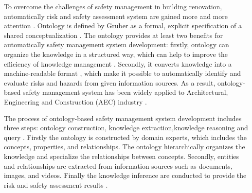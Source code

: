 To overcome the challenges of safety management in building renovation, automatically risk and safety assessment system are gained more and more attention \cite[]{xing2019ontology,doukari2023bim,amorocho2021reno,qi2023bim,zhou2023bim}. 
Ontology is defined by Gruber as a formal, explicit specification of a shared conceptualization \cite[]{gruber1995toward}. 
The ontology provides at least two benefits for automatically safety management system development: firstly, ontology can organize the knowledge in a structured way, which can help to improve the efficiency of knowledge management \cite[]{zhang2015ontology}. 
Secondly, it converts knowledge into a machine-readable format \cite[]{donini1996reasoning}, which make it possible to automatically identify and evaluate risks and hazards from given information sources.
As a result, ontology-based safety management system has been widely applied to Architectural, Engineering and Construction (AEC) industry \cite[]{zhong2015ontological,zhang2015ontology,wang2011ontology,guo2017ontology,xing2019ontology,gao2022knowledge}.

The process of ontology-based safety management system development includes three steps: ontology construction, knowledge extraction,knowledge reasoning and query \cite[]{doukari2024ontology,fang2020knowledge,wang2011ontology}. 
Firstly the ontology is constructed by domain experts, which includes the concepts, properties, and relationships. The ontology hierarchically organizes the knowledge and specialize the relationships between concepts. 
Secondly, entities and relationships are extracted from information sources such as documents, images, and videos. 
Finally the knowledge inference are conducted to provide the risk and safety assessment results \cite[]{doukari2024ontology,fang2020knowledge}.

